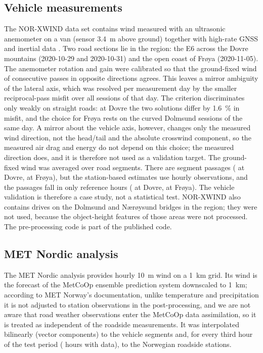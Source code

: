 \subsection{Vehicle measurements}
The NOR-XWIND data set \citep{NORXWIND} contains wind measured with an ultrasonic anemometer on a van (sensor \SI{3.4}{m} above ground) together with high-rate GNSS and inertial data \citep{Reymert2025}. Two road sections lie in the region: the E6 across the Dovre mountains (2020-10-29 and 2020-10-31) and the open coast of Frøya (2020-11-05). The anemometer rotation and gain were calibrated so that the ground-fixed wind of consecutive passes in opposite directions agrees. This leaves a mirror ambiguity of the lateral axis, which was resolved per measurement day by the smaller reciprocal-pass misfit over all sessions of that day. The criterion discriminates only weakly on straight roads: at Dovre the two solutions differ by \SI{1.6}{\percent} in misfit, and the choice for Frøya rests on the curved Dolmsund sessions of the same day. A mirror about the vehicle axis, however, changes only the measured wind direction, not the head/tail and the absolute crosswind component, so the measured air drag and energy do not depend on this choice; the measured direction does, and it is therefore not used as a validation target. The ground-fixed wind was averaged over road segments. There are \vehN{} segment passages (\vehNDovre{} at Dovre, \vehNFroya{} at Frøya), but the station-based estimates use hourly observations, and the passages fall in only \vehHours{} reference hours (\vehHoursDovre{} at Dovre, \vehHoursFroya{} at Frøya). The vehicle validation is therefore a case study, not a statistical test. NOR-XWIND also contains drives on the Dolmsund and Nærøysund bridges in the region; they were not used, because the object-height features of those areas were not processed. The pre-processing code is part of the published code.

\subsection{MET Nordic analysis}
The MET Nordic analysis \citep{MetNordic,Nipen2020} provides hourly \SI{10}{m} wind on a \SI{1}{km} grid. Its wind is the forecast of the MetCoOp ensemble prediction system \citep{Muller2017} downscaled to \SI{1}{km}; according to MET Norway's documentation, unlike temperature and precipitation it is not adjusted to station observations in the post-processing, and we are not aware that road weather observations enter the MetCoOp data assimilation, so it is treated as independent of the roadside measurements. It was interpolated bilinearly (vector components) to the vehicle segments and, for every third hour of the test period (\noMnHours{} hours with data), to the Norwegian roadside stations.

